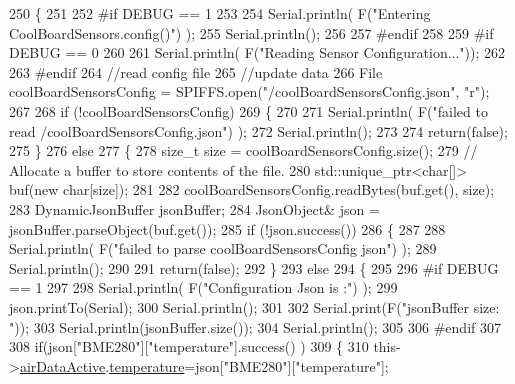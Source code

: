 \begin{DoxyCode}
250 \{
251 
252 \textcolor{preprocessor}{#if DEBUG == 1}
253 
254     Serial.println( F(\textcolor{stringliteral}{"Entering CoolBoardSensors.config()"}) );
255     Serial.println();
256 
257 \textcolor{preprocessor}{#endif}
258 
259 \textcolor{preprocessor}{#if DEBUG == 0}
260 
261     Serial.println( F(\textcolor{stringliteral}{"Reading Sensor Configuration..."}));
262 
263 \textcolor{preprocessor}{#endif}
264     \textcolor{comment}{//read config file}
265     \textcolor{comment}{//update data}
266     File coolBoardSensorsConfig = SPIFFS.open(\textcolor{stringliteral}{"/coolBoardSensorsConfig.json"}, \textcolor{stringliteral}{"r"});
267 
268     \textcolor{keywordflow}{if} (!coolBoardSensorsConfig) 
269     \{
270     
271         Serial.println( F(\textcolor{stringliteral}{"failed to read /coolBoardSensorsConfig.json"}) );
272         Serial.println();
273 
274         \textcolor{keywordflow}{return}(\textcolor{keyword}{false});
275     \}
276     \textcolor{keywordflow}{else}
277     \{
278         \textcolor{keywordtype}{size\_t} size = coolBoardSensorsConfig.size();
279         \textcolor{comment}{// Allocate a buffer to store contents of the file.}
280         std::unique\_ptr<char[]> buf(\textcolor{keyword}{new} \textcolor{keywordtype}{char}[size]);
281 
282         coolBoardSensorsConfig.readBytes(buf.get(), size);
283         DynamicJsonBuffer jsonBuffer;
284         JsonObject& json = jsonBuffer.parseObject(buf.get());
285         \textcolor{keywordflow}{if} (!json.success()) 
286         \{
287 
288             Serial.println( F(\textcolor{stringliteral}{"failed to parse coolBoardSensorsConfig json"}) );
289             Serial.println();
290     
291             \textcolor{keywordflow}{return}(\textcolor{keyword}{false});
292         \} 
293         \textcolor{keywordflow}{else}
294         \{
295 
296 \textcolor{preprocessor}{        #if DEBUG == 1}
297 
298             Serial.println( F(\textcolor{stringliteral}{"Configuration Json is :"}) );
299             json.printTo(Serial);
300             Serial.println();
301 
302             Serial.print(F(\textcolor{stringliteral}{"jsonBuffer size: "}));
303             Serial.println(jsonBuffer.size());
304             Serial.println();
305         
306 \textcolor{preprocessor}{        #endif}
307             
308             \textcolor{keywordflow}{if}(json[\textcolor{stringliteral}{"BME280"}][\textcolor{stringliteral}{"temperature"}].success() )
309             \{           
310                 this->\hyperlink{class_cool_board_sensors_abff8dfeccb2f7689847bb64d5f1cd31e}{airDataActive}.\hyperlink{struct_cool_board_sensors_1_1air_active_a9a6633c426b0508e30ebc1832ec6d745}{temperature}=json[\textcolor{stringliteral}{"BME280"}][\textcolor{stringliteral}{"temperature"}];

\end{DoxyCode}
